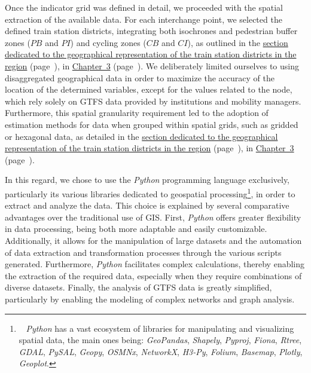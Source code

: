 \begin{refsegment}
Once the indicator grid was defined in detail, we proceeded with the spatial extraction of the available data. For each interchange point, we selected the defined train station districts, integrating both isochrones and pedestrian buffer zones (\(PB\) and \(PI\)) and cycling zones (\(CB\) and \(CI\)), as outlined in the \hyperref[chap3:quartiers-gare-analyse-geostatistique]{section dedicated to the geographical representation of the train station districts in the region} (page~\pageref{chap3:quartiers-gare-analyse-geostatistique}), in \hyperref[chap3:titre]{Chapter~3} (page~\pageref{chap3:titre}). We deliberately limited ourselves to using disaggregated geographical data in order to maximize the accuracy of the location of the determined variables, except for the values related to the node, which rely solely on \acrshort{GTFS} data provided by institutions and mobility managers. Furthermore, this spatial granularity requirement led to the adoption of estimation methods for data when grouped within spatial grids, such as gridded or hexagonal data, as detailed in the \hyperref[chap3:quartiers-gare-analyse-geostatistique]{section dedicated to the geographical representation of the train station districts in the region} (page~\pageref{chap3:quartiers-gare-analyse-geostatistique}), in \hyperref[chap3:titre]{Chapter~3} (page~\pageref{chap3:titre}).%

In this regard, we chose to use the \textsl{Python} programming language exclusively, particularly its various libraries dedicated to geospatial processing\footnote{~
    \textsl{Python} has a vast ecosystem of libraries for manipulating and visualizing spatial data, the main ones being: \textsl{GeoPandas}, \textsl{Shapely}, \textsl{Pyproj}, \textsl{Fiona}, \textsl{Rtree}, \textsl{GDAL}, \textsl{PySAL}, \textsl{Geopy}, \textsl{OSMNx}, \textsl{NetworkX}, \textsl{H3-Py}, \textsl{Folium}, \textsl{Basemap}, \textsl{Plotly}, \textsl{Geoplot}.
}, in order to extract and analyze the data. This choice is explained by several comparative advantages over the traditional use of \acrfull{GIS}. First, \textsl{Python} offers greater flexibility in data processing, being both more adaptable and easily customizable. Additionally, it allows for the manipulation of large datasets and the automation of data extraction and transformation processes through the various scripts generated. Furthermore, \textsl{Python} facilitates complex calculations, thereby enabling the extraction of the required data, especially when they require combinations of diverse datasets. Finally, the analysis of \acrshort{GTFS} data is greatly simplified, particularly by enabling the modeling of complex networks and graph analysis.%


\end{refsegment}
